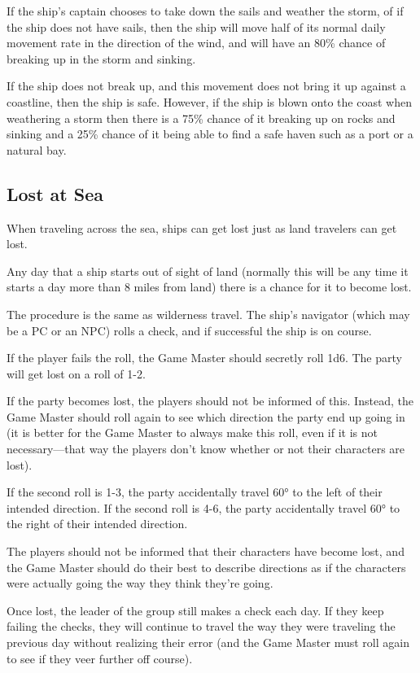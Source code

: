 \begin{multicols*}{2}
If the ship’s captain chooses to take down the sails and weather the storm, of if the ship does not have sails, then the ship will move half of its normal daily movement rate in the direction of the wind, and will have an 80\% chance of breaking up in the storm and sinking.

If the ship does not break up, and this movement does not bring it up against a coastline, then the ship is safe. However, if the ship is blown onto the coast when weathering a storm then there is a 75\% chance of it breaking up on rocks and sinking and a 25\% chance of it being able to find a safe haven such as a port or a natural bay.

\subsection{Lost at Sea}
When traveling across the sea, ships can get lost just as land travelers can get lost.

Any day that a ship starts out of sight of land (normally this will be any time it starts a day more than 8 miles from land) there is a chance for it to become lost.

The procedure is the same as wilderness travel. The ship’s navigator (which may be a PC or an NPC) rolls a  check, and if successful the ship is on course.

If the player fails the roll, the Game Master should secretly roll 1d6. The party will get lost on a roll of 1-2.

If the party becomes lost, the players should not be informed of this. Instead, the Game Master should roll again to see which direction the party end up going in (it is better for the Game Master to always make this roll, even if it is not necessary—that way the players don’t know whether or not their characters are lost).

If the second roll is 1-3, the party accidentally travel 60° to the left of their intended direction. If the second roll is 4-6, the party accidentally travel 60° to the right of their intended direction.

The players should not be informed that their characters have become lost, and the Game Master should do their best to describe directions as if the characters were actually going the way they think they’re going.

Once lost, the leader of the group still makes a  check each day. If they keep failing the checks, they will continue to travel the way they were traveling the previous day without realizing their error (and the Game Master must roll again to see if they veer further off course).


\end{multicols*}
